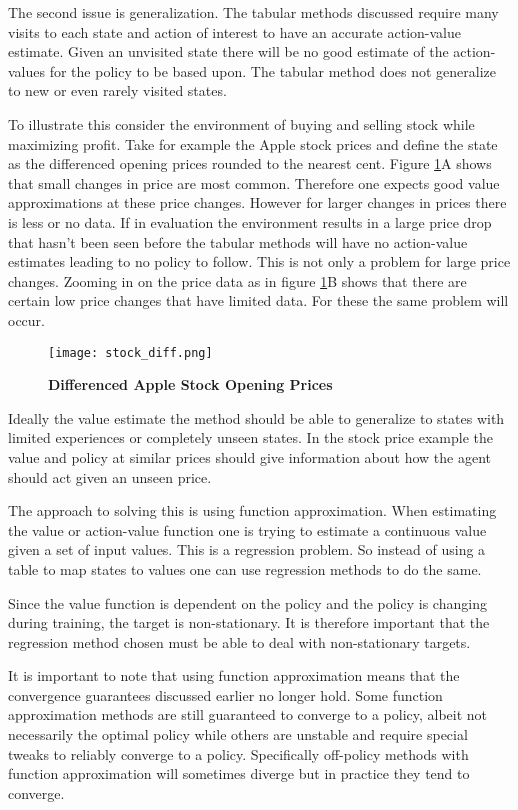 The second issue is generalization. The tabular methods discussed require many visits to each state and action of interest to have an accurate action-value estimate. Given an unvisited state there will be no good estimate of the action-values for the policy to be based upon. The tabular method does not generalize to new or even rarely visited states.

To illustrate this consider the environment of buying and selling stock while maximizing profit. Take for example the Apple stock prices and define the state as the differenced opening prices rounded to the nearest cent. Figure \ref{fig:stock_diff}A shows that small changes in price are most common. Therefore one expects good value approximations at these price changes. However for larger changes in prices there is less or no data. If in evaluation the environment results in a large price drop that hasn't been seen before the tabular methods will have no action-value estimates leading to no policy to follow. This is not only a problem for large price changes. Zooming in on the price data as in figure \ref{fig:stock_diff}B shows that there are certain low price changes that have limited data. For these the same problem will occur.

\begin{figure}[H] %
    \texttt{[image: stock\_diff.png]}
    \caption{\textbf{Differenced Apple Stock Opening Prices}}
    \label{fig:stock_diff}
\end{figure}

Ideally the value estimate the method should be able to generalize to states with limited experiences or completely unseen states. In the stock price example the value and policy at similar prices should give information about how the agent should act given an unseen price. 

The approach to solving this is using function approximation. When estimating the value or action-value function one is trying to estimate a continuous value given a set of input values. This is a regression problem. So instead of using a table to map states to values one can use regression methods to do the same. 

Since the value function is dependent on the policy and the policy is changing during training, the target is non-stationary. It is therefore important that the regression method chosen must be able to deal with non-stationary targets.\cite[p.~198-199]{sutton_barto_2018}

It is important to note that using function approximation means that the convergence guarantees discussed earlier no longer hold. Some function approximation methods are still guaranteed to converge to a policy, albeit not necessarily the optimal policy while others are unstable and require special tweaks to reliably converge to a policy. Specifically off-policy methods with function approximation will sometimes diverge but in practice they tend to converge\citep[p~.258]{sutton_barto_2018}.

